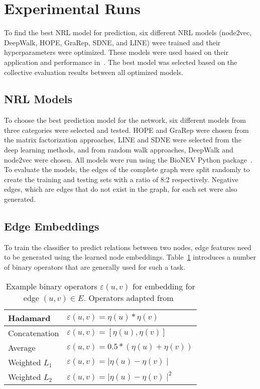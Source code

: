 \section{Experimental Runs}

To find the best \ac{NRL} model for prediction, six different \ac{NRL} models (node2vec, DeepWalk, \ac{HOPE}, \ac{GraRep}, \ac{SDNE}, and \ac{LINE}) were trained and their hyperparameters were optimized.
These models were used based on their application and performance in~\cite{yue_graph_2019}.
The best model was selected based on the collective evaluation results between all optimized models.

\subsection{\ac{NRL} Models}

To choose the best prediction model for the network, six different models from three categories were selected and tested.
\ac{HOPE} and \ac{GraRep} were chosen from the matrix factorization approaches, \ac{LINE} and \ac{SDNE} were selected from the deep learning methods, and from random walk approaches, DeepWalk and node2vec were chosen.
All models were run using the BioNEV Python package~\cite{yue_graph_2019}.
To evaluate the models, the edges of the complete graph were split randomly to create the training and testing sets with a ratio of 8:2 respectively.
Negative edges, which are edges that do not exist in the graph, for each set were also generated.

\subsection{Edge Embeddings}

To train the classifier to predict relations between two nodes, edge features need to be generated using the learned node embeddings.
Table~\ref{tab:operators} introduces a number of binary operators that are generally used for such a task.

\begin{table}[h!]
    \centering
    \begin{tabular}{ |l|l| }
        \hline
        Hadamard & $\varepsilon(u,v)= \eta(u)*\eta(v)$ \\
        \hline
        Concatenation & $\varepsilon(u,v)=[\eta(u), \eta(v)]$ \\
        \hline
        Average & $\varepsilon(u,v)=0.5*(\eta(u)+\eta(v))$ \\
        \hline
        Weighted $L_{1}$ & $\varepsilon(u,v)=\mid\eta(u)-\eta(v)\mid$ \\
        \hline
        Weighted $L_{2}$ & $\varepsilon(u,v)=\mid\eta(u)-\eta(v)\mid^2$ \\
        \hline
    \end{tabular}
    \caption[Example binary operators $\varepsilon(u,v)$ for embedding for edge $(u,v) \in E$]{Example binary operators $\varepsilon(u,v)$ for embedding for edge $(u,v) \in E$. Operators adapted from~\cite{grover_node2vec:_2016}}
    \label{tab:operators}
\end{table}


